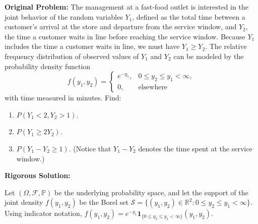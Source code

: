 \documentclass[11pt, letterpaper]{article}
\theoremstyle{definition}
\theoremstyle{remark}
\newcommand{\Prob}{\mathbb{P}}
\newcommand{\F}{\mathcal{F}}
\begin{document}
\textbf{Original Problem:}
The management at a fast-food outlet is interested in the joint behavior of the random variables $Y_1$, defined as the total time between a customer's arrival at the store and departure from the service window, and $Y_2$, the time a customer waits in line before reaching the service window. Because $Y_1$ includes the time a customer waits in line, we must have $Y_1 \ge Y_2$. The relative frequency distribution of observed values of $Y_1$ and $Y_2$ can be modeled by the probability density function
\[ f(y_1, y_2) = \begin{cases} e^{-y_1}, & 0 \le y_2 \le y_1 < \infty, \\ 0, & \text{elsewhere} \end{cases} \]
with time measured in minutes. Find:
\begin{enumerate}[label=\textbf{\alph*}]
    \item $P(Y_1 < 2, Y_2 > 1)$.
    \item $P(Y_1 \ge 2Y_2)$.
    \item $P(Y_1 - Y_2 \ge 1)$. (Notice that $Y_1 - Y_2$ denotes the time spent at the service window.)
\end{enumerate}

\textbf{Rigorous Solution:}

Let $(\Omega, \F, \Prob)$ be the underlying probability space, and let the support of the joint density $f(y_1, y_2)$ be the Borel set $\mathcal{S} = \{(y_1, y_2) \in \mathbb{R}^2 : 0 \le y_2 \le y_1 < \infty\}$. Using indicator notation, $f(y_1, y_2) = e^{-y_1} \mathbf{1}_{\{0 \le y_2 \le y_1 < \infty\}}(y_1, y_2)$.
\end{document}
